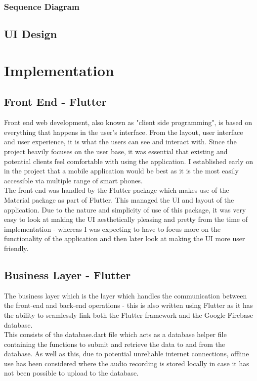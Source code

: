 \documentclass{report}
\begin{document}
		\subsection{Sequence Diagram}
	\section{UI Design}

\chapter{Implementation}
	\section{Front End - Flutter}
	 Front end web development, also known as "client side programming", is based on everything that happens in the user's interface. From the layout, user interface and user experience, it is what the users can see and interact with. Since the project heavily focuses on the user base, it was essential that existing and potential clients feel comfortable with using the application. I established early on in the project that a mobile application would be best as it is the most easily accessible via multiple range of smart phones.\\
	
	The front end was handled by the Flutter package which makes use of the Material package as part of Flutter. This managed the UI and layout of the application. Due to the nature and simplicity of use of this package, it was very easy to look at making the UI aesthetically pleasing and pretty from the time of implementation - whereas I was expecting to have to focus more on the functionality of the application and then later look at making the UI more user friendly.

	\section{Business Layer - Flutter}
	The business layer which is the layer which handles the communication between the front-end and back-end operations - this is also written using Flutter as it has the ability to seamlessly link both the Flutter framework and the Google Firebase database. \\
	
	This consists of the database.dart file which acts as a database helper file containing the functions to submit and retrieve the data to and from the database. As well as this, due to potential unreliable internet connections, offline use has been considered where the audio recording is stored locally in case it has not been possible to upload to the database. \\
	
\end{document}
